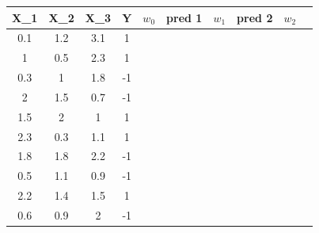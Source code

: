 \documentclass[12pt]{article}
\begin{document}
\begin{center}
\begin{tabular}{|c|c|c|c|c|c|c|c|c|c|}
    \hline
    X\_1 & X\_2 & X\_3 & Y & $w_0$ & pred 1 & $w_1$ & pred 2 & $w_2$ \\
    \hline
    0.1 & 1.2 & 3.1 & 1  &       &              &       &              &      \\
    \hline
    1   & 0.5 & 2.3 & 1  &       &              &       &              &      \\
    \hline
    0.3 & 1   & 1.8 & -1 &       &              &       &              &      \\
    \hline
    2   & 1.5 & 0.7 & -1 &       &              &       &              &      \\
    \hline
    1.5 & 2   & 1   & 1  &       &              &       &              &      \\
    \hline
    2.3 & 0.3 & 1.1 & 1  &       &              &       &              &      \\
    \hline
    1.8 & 1.8 & 2.2 & -1 &       &              &       &              &      \\
    \hline
    0.5 & 1.1 & 0.9 & -1 &       &              &       &              &      \\
    \hline
    2.2 & 1.4 & 1.5 & 1  &       &              &       &              &      \\
    \hline
    0.6 & 0.9 & 2   & -1 &       &              &       &              &      \\
    \hline
\end{tabular}
\end{center}
\end{document}
